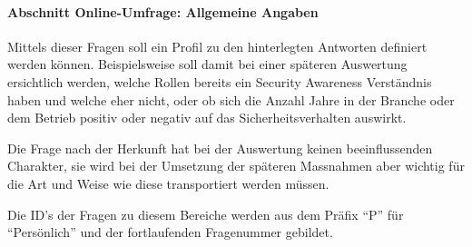 \documentclass[../../main.tex]{subfiles}
\begin{document}
\paragraph*{Abschnitt Online-Umfrage: Allgemeine Angaben}\mbox{}

\begin{sloppypar}
Mittels dieser Fragen soll ein Profil zu den hinterlegten Antworten definiert werden können. Beispielsweise soll damit bei einer späteren Auswertung ersichtlich werden, welche Rollen bereits ein Security Awareness Verständnis haben und welche eher nicht, oder ob sich die Anzahl Jahre in der Branche oder dem Betrieb positiv oder negativ auf das Sicherheitsverhalten auswirkt.

Die Frage nach der Herkunft hat bei der Auswertung keinen beeinflussenden Charakter, sie wird bei der Umsetzung der späteren Massnahmen aber wichtig für die Art und Weise wie diese transportiert werden müssen.

Die ID's der Fragen zu diesem Bereiche werden aus dem Präfix "`P"' für "`Persönlich"' und der fortlaufenden Fragenummer gebildet.
\end{sloppypar}


\sloppy 
\end{document}
